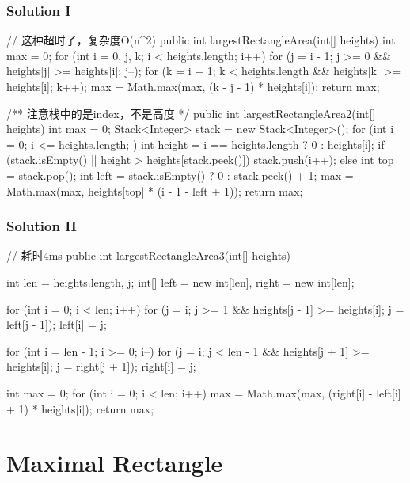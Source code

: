 \newpage

\subsubsection{Solution I}

\begin{Code}
// 这种超时了，复杂度O(n^2)
public int largestRectangleArea(int[] heights) {
    int max = 0;
    for (int i = 0, j, k; i < heights.length; i++) {
        for (j = i - 1; j >= 0 && heights[j] >= heights[i]; j--);
        for (k = i + 1; k < heights.length && heights[k] >= heights[i]; k++);
        max = Math.max(max, (k - j - 1) * heights[i]);
    }
    return max;
}

/** 注意栈中的是index，不是高度 */
public int largestRectangleArea2(int[] heights) {
    int max = 0;
    Stack<Integer> stack = new Stack<Integer>();
    for (int i = 0; i <= heights.length; ) {
        int height = i == heights.length ? 0 : heights[i];
        if (stack.isEmpty() || height > heights[stack.peek()]) {
            stack.push(i++);
        } else {
            int top = stack.pop();
            int left = stack.isEmpty() ? 0 : stack.peek() + 1;
            max = Math.max(max, heights[top] * (i - 1 - left + 1));
        }
    }
    return max;
}
\end{Code}

\subsubsection{Solution II}
\begin{Code}
// 耗时4ms
public int largestRectangleArea3(int[] heights) {
    int len = heights.length, j;
    int[] left = new int[len], right = new int[len];

    for (int i = 0; i < len; i++) {
        for (j = i; j >= 1 && heights[j - 1] >= heights[i]; j = left[j - 1]);
        left[i] = j;
    }

    for (int i = len - 1; i >= 0; i--) {
        for (j = i; j < len - 1 && heights[j + 1] >= heights[i]; j = right[j + 1]);
        right[i] = j;
    }

    int max = 0;
    for (int i = 0; i < len; i++) {
        max = Math.max(max, (right[i] - left[i] + 1) * heights[i]);
    }
    return max;
}
\end{Code}

\newpage

\section{Maximal Rectangle} %

